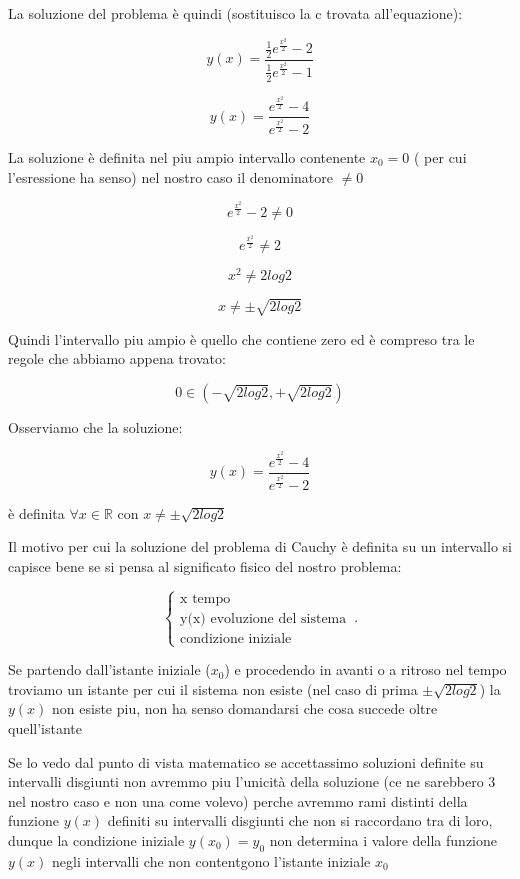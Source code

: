 \documentclass[11pt]{article}
\begin{document}
La soluzione del problema è quindi (sostituisco la c trovata all'equazione):

\[
    y(x) = \frac{\frac{1}{2} e ^{\frac{x ^{2}}{2} }-2}{\frac{1}{2} e ^{\frac{x ^{2}}{2} }-1} 
\]

\[
    y(x) = \frac{ e ^{\frac{x ^{2}}{2} }-4}{ e ^{\frac{x ^{2}}{2} }-2} 
\]

La soluzione è definita nel piu ampio intervallo contenente $x_0 = 0 $ ( per cui l'esressione ha senso) nel nostro caso il denominatore $\neq 0$

\[
    e ^{\frac{x ^{2}}{2} } - 2 \neq 0
\]

\[
    e ^{\frac{x ^{2}}{2} }  \neq 2
\]

\[
    x ^{2} \neq 2 log 2
\]

\[
    x \neq \pm \sqrt{2 log2}
\]

Quindi l'intervallo piu ampio è quello che contiene zero ed è compreso tra le regole che abbiamo appena trovato:

\[
    0 \in (-\sqrt{2log2},+\sqrt{2log2}) 
\]

Osserviamo che la soluzione:

\[
    y(x) = \frac{ e ^{\frac{x ^{2}}{2} }-4}{ e ^{\frac{x ^{2}}{2} }-2} 
\]

è definita $\forall x \in \mathbb{R}$ con $x \neq \pm \sqrt{2log2}$


Il motivo per cui la soluzione del problema di Cauchy è definita su un intervallo si capisce bene se si pensa al significato fisico del nostro problema:

\begin{equation}
    \begin{cases}
        \text{x tempo}\\
        \text{y(x) evoluzione del sistema}\\
        \text{condizione iniziale}
    \end{cases}\,.
\end{equation}

Se partendo dall'istante iniziale ($x_0$) e procedendo in avanti o a ritroso nel tempo troviamo un istante per cui il sistema non esiste (nel caso di prima $\pm \sqrt{2log2}$) la $y(x)$ non esiste piu, non ha senso domandarsi che cosa succede oltre quell'istante

Se lo vedo dal punto di vista matematico se accettassimo soluzioni definite su intervalli disgiunti non avremmo piu l'unicità della soluzione (ce ne sarebbero 3 nel nostro caso e non una come volevo) perche avremmo rami distinti della funzione $y(x)$ definiti su intervalli disgiunti che non si raccordano tra di loro, dunque la condizione iniziale $y(x_0) = y_0$ non determina i valore della funzione $y(x)$ negli intervalli che non contentgono l'istante iniziale $x_0$
\end{document}
